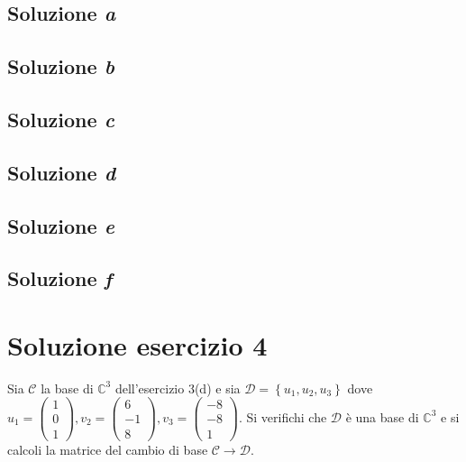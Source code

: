 \documentclass[a4paper]{article}
\begin{document}
	\subsection{Soluzione \emph{a}}
	
	\subsection{Soluzione \emph{b}}
	
	\subsection{Soluzione \emph{c}}
	
	\subsection{Soluzione \emph{d}}
	
	\subsection{Soluzione \emph{e}}
	
	\subsection{Soluzione \emph{f}}
	
	\section{Soluzione esercizio 4}
	
	Sia $\mathscr{C}$ la base di $\mathbb{C}^{3}$ dell'esercizio 3(d) e sia $\mathscr{D} = \left\{u_{1}, u_{2}, u_{3}\right\}$ dove $u_{1} = \begin{pmatrix}
		1 \\ 0 \\ 1
	\end{pmatrix}, v_{2} = \begin{pmatrix}
		6 \\ -1 \\ 8
	\end{pmatrix}, v_{3} = \begin{pmatrix}
		-8 \\ -8 \\ 1
	\end{pmatrix}$. Si verifichi che $\mathscr{D}$ è una base di $\mathbb{C}^{3}$ e si calcoli la matrice del cambio di base $\mathscr{C} \rightarrow \mathscr{D}$.
\end{document}

